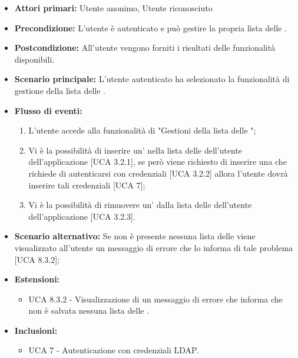 \begin{itemize}
	\item \textbf{Attori primari:} Utente anonimo, Utente riconosciuto
	\item \textbf{Precondizione:} L'utente è autenticato e può gestire la propria lista delle .
	\item \textbf{Postcondizione:} All'utente vengono forniti i risultati delle funzionalità disponibili.
	\item \textbf{Scenario principale:} L'utente autenticato ha selezionato la funzionalità di gestione della lista delle .
	\item \textbf{Flusso di eventi:}
			\begin{enumerate}
			\item L'utente accede alla funzionalità di "Gestioni della lista delle ";
			\item Vi è la possibilità di inserire un' nella lista delle  dell'utente dell'applicazione [UCA 3.2.1], se però viene richiesto di inserire una  che richiede di autenticarsi con credenziali  [UCA 3.2.2] allora l'utente dovrà inserire tali credenziali [UCA 7];
			\item Vi è la possibilità di rimuovere un' dalla lista delle  dell'utente dell'applicazione [UCA 3.2.3].
			\end{enumerate}
	\item \textbf{Scenario alternativo:} Se non è presente nessuna lista delle  viene visualizzato all'utente un messaggio di errore che lo informa di tale problema [UCA 8.3.2];
	\item \textbf{Estensioni:}
	\begin{itemize}
		\item UCA 8.3.2 - Visualizzazione di un messaggio di errore che informa che non è salvata nessuna lista delle .
	\end{itemize}
	\item \textbf{Inclusioni:}
	\begin{itemize}
			\item UCA 7 - Autenticazione con credenziali LDAP.
	\end{itemize}
\end{itemize}

